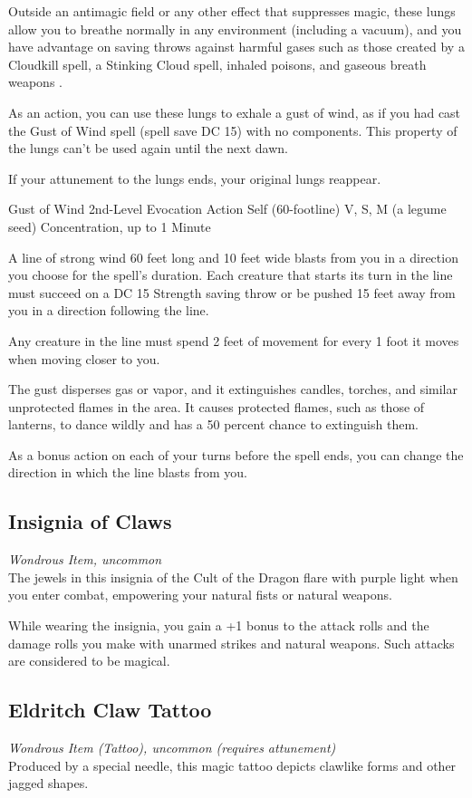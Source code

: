 \documentclass[letterpaper,openany,oneside,twocolumn]{book}
\begin{document}
Outside an antimagic field or any other effect that suppresses magic, these lungs allow you to breathe normally in any environment (including a vacuum), and you have advantage on saving throws against harmful gases such as those created by a Cloudkill spell, a Stinking Cloud spell, inhaled poisons, and gaseous breath weapons .

As an action, you can use these lungs to exhale a gust of wind, as if you had cast the Gust of Wind spell (spell save DC 15) with no components. This property of the lungs can't be used again until the next dawn.

If your attunement to the lungs ends, your original lungs reappear.

\DndSpellHeader
  {Gust of Wind}
  {2nd-Level Evocation}
  {Action}
  {Self (60-footline)}
  {V, S, M (a legume seed)}
  {Concentration, up to 1 Minute}

A line of strong wind 60 feet long and 10 feet wide blasts from you in a direction you choose for the spell’s duration. Each creature that starts its turn in the line must succeed on a DC 15 Strength saving throw or be pushed 15 feet away from you in a direction following the line.

Any creature in the line must spend 2 feet of movement for every 1 foot it moves when moving closer to you.

The gust disperses gas or vapor, and it extinguishes candles, torches, and similar unprotected flames in the area. It causes protected flames, such as those of lanterns, to dance wildly and has a 50 percent chance to extinguish them.

As a bonus action on each of your turns before the spell ends, you can change the direction in which the line blasts from you.
\vfill\eject
\subsection*{Insignia of Claws}
\textit{Wondrous Item, uncommon}\\
The jewels in this insignia of the Cult of the Dragon flare with purple light when you enter combat, empowering your natural fists or natural weapons.

While wearing the insignia, you gain a +1 bonus to the attack rolls and the damage rolls you make with unarmed strikes and natural weapons. Such attacks are considered to be magical.

\subsection*{Eldritch Claw Tattoo}
\textit{Wondrous Item (Tattoo), uncommon (requires attunement)}\\
Produced by a special needle, this magic tattoo depicts clawlike forms and other jagged shapes.
\end{document}
